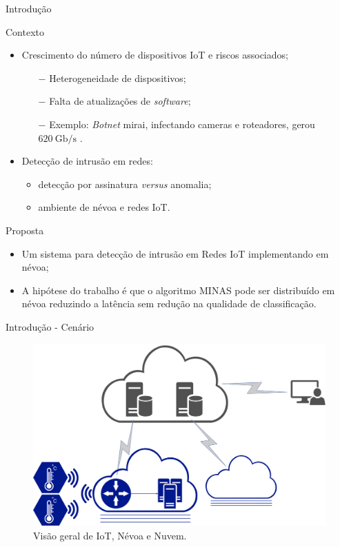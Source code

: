 \documentclass[aspectratio=1610,10pt]{beamer}
\newcommand{\fonte}[1]{\vspace{-1em}{\footnotesize\textbf{Fonte:} #1}}
\begin{document}
\begin{frame}{Introdução}
  \begin{block}{Contexto}
  \begin{itemize}%
  \item Crescimento do número de dispositivos IoT e riscos associados;
  \begin{itemize}
    \item[$-$] Heterogeneidade de dispositivos;
    \item[$-$] Falta de atualizações de \emph{software};
    \item[$-$] Exemplo: \emph{Botnet} mirai, infectando cameras e roteadores, gerou
    $620 \ \mathrm{Gb/s}$ \cite{Kambourakis2017}.
  \end{itemize}
  \item Detecção de intrusão em redes:
  \begin{itemize}
    \item detecção por assinatura \emph{versus} anomalia;
    \item ambiente de névoa e redes IoT.
  \end{itemize}
  \end{itemize}
  \end{block}

  \pause
  \begin{block}{Proposta}
  \begin{itemize}%
  \item Um sistema para detecção de intrusão em Redes IoT implementando em névoa;
  \item A hipótese do trabalho é que o algoritmo MINAS pode ser distribuído em
  névoa reduzindo a latência sem redução na qualidade de classificação.
  \end{itemize}
  \end{block}
\end{frame}


\begin{frame}{Introdução - Cenário}
  \begin{figure}\centering
    \includegraphics[width=0.75\linewidth]{figures/mfog-arch-fisica.png}
    \caption{Visão geral de IoT, Névoa e Nuvem.}
    \fonte{O autor.}
  \end{figure}
\end{frame}
\end{document}
